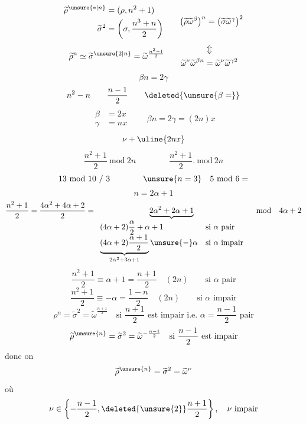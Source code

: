 \[
\begin{aligned}
\widetilde\rho^{\unsure{*|n}}&=(\rho,n^2+1)\\
\widetilde\sigma^{2}&=\left(\sigma,\frac{n^3+n}{2}\right)
\end{aligned}
\qquad
\bigl(\widetilde\rho\widetilde\omega^{\beta}\bigr)^n
=\bigl(\widetilde\sigma\widetilde\omega^{\gamma}\bigr)^2
\]
\[
\widetilde\rho^n\simeq\widetilde\sigma^{\unsure{2|n}}
=\widetilde\omega^{\frac{n^2+1}{2}}
\qquad
\begin{gathered}
\Updownarrow\\
\widetilde\omega^\nu\widetilde\omega^{\beta n}
=\widetilde\omega^\nu\widetilde\omega^{\gamma2}
\end{gathered}
\]
\[
\beta n=2\gamma
\]
\[
n^2-n\qquad\frac{n-1}{2}\qquad\deleted{\unsure{\beta=}}
\]
\[
\begin{aligned}
\beta&=2x\\
\gamma&=nx
\end{aligned}
\qquad
\beta n=2\gamma=(2n)x
\]
\[
\nu+\uline{2nx}
\]
\[
\frac{n^2+1}{2}\ \mathrm{mod}\ 2n
\qquad\qquad
\frac{n^2+1}{2}.\ \mathrm{mod}\ 2n
\]
\[
13\ \mathrm{mod}\ 10\ /\ 3
\qquad\qquad
\unsure{n=3}\quad5\ \mathrm{mod}\ 6=
\]
\[
n=2\alpha+1
\]
\[
\frac{n^2+1}{2}
=\frac{4\alpha^2+4\alpha+2}{2}
=\underbrace{2\alpha^2+2\alpha+1}_{
\begin{array}{ll}
(4\alpha+2)\dfrac{\alpha}{2}+\alpha+1&\text{si }\alpha\text{ pair}\\
\underbrace{(4\alpha+2)\dfrac{\alpha+1}{2}}_{2\alpha^2+3\alpha+1}
\unsure{-}\alpha&\text{si }\alpha\text{ impair}
\end{array}}
\quad\mathrm{mod}\quad4\alpha+2
\]
\[
\frac{n^2+1}{2}\equiv\alpha+1=\frac{n+1}{2}
\quad(2n)\qquad\text{si }\alpha\text{ pair}
\]
\[
\frac{n^2+1}{2}\equiv-\alpha=\frac{1-n}{2}
\quad(2n)\qquad\text{si }\alpha\text{ impair}
\]
\[
\rho^n=\widetilde\sigma^2=\widetilde\omega^{\frac{n+1}{2}}
\quad\text{si }\frac{n+1}{2}\text{ est impair i.e. }\alpha=\frac{n-1}{2}\text{ pair}
\]
\[
\widetilde\rho^{\unsure{n}}=\widetilde\sigma^2
=\widetilde\omega^{-\frac{n-1}{2}}
\quad\text{si }\frac{n-1}{2}\text{ est impair}
\]
donc on  
\[
\widetilde\rho^{\unsure{n}}=\widetilde\sigma^2=\widetilde\omega^\nu
\]
où
\[
\nu\in\left\{-\frac{n-1}{2},\deleted{\unsure{2}}\frac{n+1}{2}\right\},
\quad\nu\text{ impair}
\]
